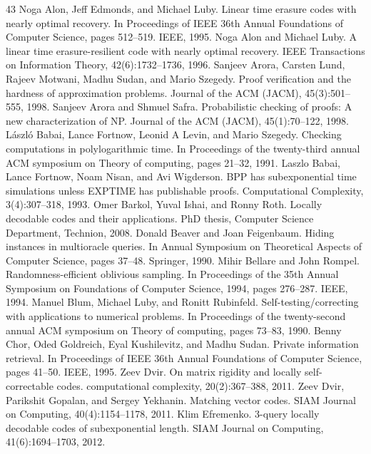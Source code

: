 \documentclass[10pt,a4paper]{article}
\begin{document}
\begin{thebibliography}{43}
Noga Alon, Jeff Edmonds, and Michael Luby. Linear time erasure codes with nearly optimal recovery. In Proceedings of IEEE 36th Annual Foundations of Computer Science, pages 512–519. IEEE, 1995.
Noga Alon and Michael Luby. A linear time erasure-resilient code with nearly optimal recovery. IEEE Transactions on Information Theory, 42(6):1732–1736, 1996.
Sanjeev Arora, Carsten Lund, Rajeev Motwani, Madhu Sudan, and Mario Szegedy. Proof verification and the hardness of approximation problems. Journal of the ACM (JACM), 45(3):501–555, 1998.
Sanjeev Arora and Shmuel Safra. Probabilistic checking of proofs: A new characterization of NP. Journal of the ACM (JACM), 45(1):70–122, 1998.
László Babai, Lance Fortnow, Leonid A Levin, and Mario Szegedy. Checking computations in polylogarithmic time. In Proceedings of the twenty-third annual ACM symposium on Theory of computing, pages 21–32, 1991.
Laszlo Babai, Lance Fortnow, Noam Nisan, and Avi Wigderson. BPP has subexponential time simulations unless EXPTIME has publishable proofs. Computational Complexity, 3(4):307–318, 1993.
Omer Barkol, Yuval Ishai, and Ronny Roth. Locally decodable codes and their applications. PhD thesis, Computer Science Department, Technion, 2008.
Donald Beaver and Joan Feigenbaum. Hiding instances in multioracle queries. In Annual Symposium on Theoretical Aspects of Computer Science, pages 37–48. Springer, 1990.
Mihir Bellare and John Rompel. Randomness-efficient oblivious sampling. In Proceedings of the 35th Annual Symposium on Foundations of Computer Science, 1994, pages 276–287. IEEE, 1994.
Manuel Blum, Michael Luby, and Ronitt Rubinfeld. Self-testing/correcting with applications to numerical problems. In Proceedings of the twenty-second annual ACM symposium on Theory of computing, pages 73–83, 1990.
Benny Chor, Oded Goldreich, Eyal Kushilevitz, and Madhu Sudan. Private information retrieval. In Proceedings of IEEE 36th Annual Foundations of Computer Science, pages 41–50. IEEE, 1995.
Zeev Dvir. On matrix rigidity and locally self-correctable codes. computational complexity, 20(2):367–388, 2011.
Zeev Dvir, Parikshit Gopalan, and Sergey Yekhanin. Matching vector codes. SIAM Journal on Computing, 40(4):1154–1178, 2011.
Klim Efremenko. 3-query locally decodable codes of subexponential length. SIAM Journal on Computing, 41(6):1694–1703, 2012.

\end{thebibliography}
\end{document}
